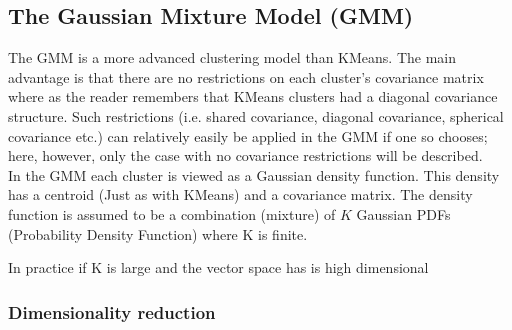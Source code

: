 \subsection{The Gaussian Mixture Model (GMM)}

The GMM is a more advanced clustering model than KMeans. 
The main advantage is that there are no restrictions on each cluster's covariance matrix where as the reader remembers that KMeans clusters had a diagonal covariance structure. 
Such restrictions (i.e. shared covariance, diagonal covariance, spherical covariance etc.) can relatively easily be applied in the GMM if one so chooses; here, however, only the case with no covariance restrictions will be described.
\\
In the GMM each cluster is viewed as a Gaussian density function. 
This density has a centroid (Just as with KMeans) and a covariance matrix.
The density function is assumed to be a combination (mixture) of $K$ Gaussian PDFs (Probability Density Function) where K is finite.


In practice if K is large and the vector space has is high dimensional 

\subsubsection{Dimensionality reduction}